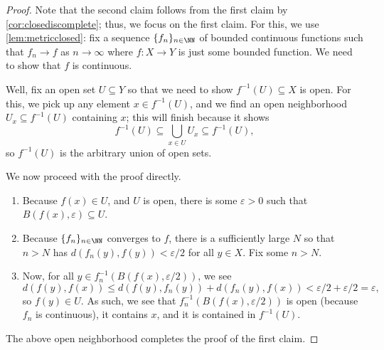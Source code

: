 \documentclass[../notes.tex]{subfiles}
\begin{document}
\begin{proof}
	Note that the second claim follows from the first claim by \autoref{cor:closediscomplete}; thus, we focus on the first claim. For this, we use \autoref{lem:metricclosed}: fix a sequence $\{f_n\}_{n\in\NN}$ of bounded continuous functions such that $f_n\to f$ as $n\to\infty$ where $f\colon X\to Y$ is just some bounded function. We need to show that $f$ is continuous.

	Well, fix an open set $U\subseteq Y$ so that we need to show $f^{-1}(U)\subseteq X$ is open. For this, we pick up any element $x\in f^{-1}(U)$, and we find an open neighborhood $U_x\subseteq f^{-1}(U)$ containing $x$; this will finish because it shows
	\[f^{-1}(U)\subseteq\bigcup_{x\in U}U_x\subseteq f^{-1}(U),\]
	so $f^{-1}(U)$ is the arbitrary union of open sets.

	We now proceed with the proof directly.
	\begin{enumerate}
		\item Because $f(x)\in U$, and $U$ is open, there is some $\varepsilon>0$ such that $B(f(x),\varepsilon)\subseteq U$.
		\item Because $\{f_n\}_{n\in\NN}$ converges to $f$, there is a sufficiently large $N$ so that $n>N$ has $d(f_n(y),f(y))<\varepsilon/2$ for all $y\in X$. Fix some $n>N$.
		\item Now, for all $y\in f_n^{-1}(B(f(x),\varepsilon/2))$, we see
		\[d(f(y),f(x))\le d(f(y),f_n(y))+d(f_n(y),f(x))<\varepsilon/2+\varepsilon/2=\varepsilon,\]
		so $f(y)\in U$. As such, we see that $f_n^{-1}(B(f(x),\varepsilon/2))$ is open (because $f_n$ is continuous), it contains $x$, and it is contained in $f^{-1}(U)$.
	\end{enumerate}
	The above open neighborhood completes the proof of the first claim.
\end{proof}
\end{document}
